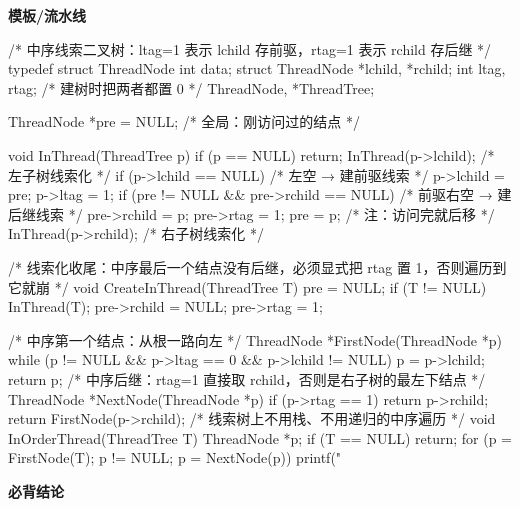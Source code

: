 \documentclass[10pt,a4paper]{ctexart}
\begin{document}
\textbf{模板/流水线}

\begin{codebox}
/* 中序线索二叉树：ltag=1 表示 lchild 存前驱，rtag=1 表示 rchild 存后继 */
typedef struct ThreadNode {
    int data;
    struct ThreadNode *lchild, *rchild;
    int ltag, rtag;                        /* 建树时把两者都置 0 */
} ThreadNode, *ThreadTree;

ThreadNode *pre = NULL;                    /* 全局：刚访问过的结点 */

void InThread(ThreadTree p) {
    if (p == NULL) return;
    InThread(p->lchild);                   /* 左子树线索化 */
    if (p->lchild == NULL) {               /* 左空 → 建前驱线索 */
        p->lchild = pre;  p->ltag = 1;
    }
    if (pre != NULL && pre->rchild == NULL) {   /* 前驱右空 → 建后继线索 */
        pre->rchild = p;  pre->rtag = 1;
    }
    pre = p;                               /* 注：访问完就后移 */
    InThread(p->rchild);                   /* 右子树线索化 */
}

/* 线索化收尾：中序最后一个结点没有后继，必须显式把 rtag 置 1，否则遍历到它就崩 */
void CreateInThread(ThreadTree T) {
    pre = NULL;
    if (T != NULL) {
        InThread(T);
        pre->rchild = NULL;
        pre->rtag = 1;
    }
}

/* 中序第一个结点：从根一路向左 */
ThreadNode *FirstNode(ThreadNode *p) {
    while (p != NULL && p->ltag == 0 && p->lchild != NULL) p = p->lchild;
    return p;
}
/* 中序后继：rtag=1 直接取 rchild，否则是右子树的最左下结点 */
ThreadNode *NextNode(ThreadNode *p) {
    if (p->rtag == 1) return p->rchild;
    return FirstNode(p->rchild);
}
/* 线索树上不用栈、不用递归的中序遍历 */
void InOrderThread(ThreadTree T) {
    ThreadNode *p;
    if (T == NULL) return;
    for (p = FirstNode(T); p != NULL; p = NextNode(p))
        printf("%
}
\end{codebox}





\textbf{必背结论}
\end{document}
